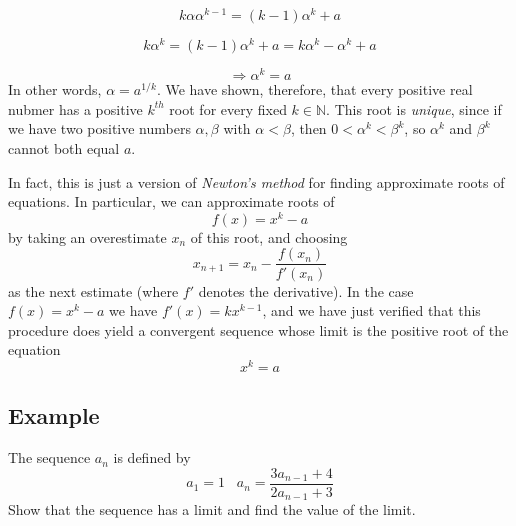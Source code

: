 \documentclass[12pt]{scrbook}
\begin{document}
\[ k \alpha \alpha^{k-1} = (k-1)\alpha^k + a \]

\[ k\alpha^k = (k-1)\alpha^k + a = k\alpha^k - \alpha^k + a \]

\[ \Rightarrow \alpha^k = a \]
In other words, $\alpha = a^{1/k}$.    We have shown, therefore, that every positive real nubmer has a positive
$k^{th}$ root for every fixed $k \in \mathbb{N}$.  This root is {\em unique}, since if we have two positive numbers
$\alpha, \beta$ with $\alpha < \beta$, then $0 < \alpha^k < \beta^k$, so $\alpha^k$ and $\beta^k$ cannot both equal $a$.

In fact, this is just a version of {\em Newton's method} for finding approximate roots of equations.  In particular, we can
approximate roots of 
\[ f(x) = x^k - a \]
by taking an overestimate $x_n$ of this root, and choosing
\[ x_{n+1} = x_n - \frac{f(x_n)}{f'(x_n)} \]
as the next estimate (where $f'$ denotes the derivative).  In the case $f(x) = x^k - a$ we have $f'(x) = kx^{k-1}$, and we 
have just verified that this procedure does yield a convergent sequence whose limit is the positive root of the equation
\[ x^k = a \]

\subsection{Example}
The sequence $a_n$ is defined by 
\[ a_1 = 1 \;\;\; a_n = \frac{3a_{n-1} + 4}{2a_{n-1} + 3} \]
Show that the sequence has a limit and find the value of the limit.
\end{document}
